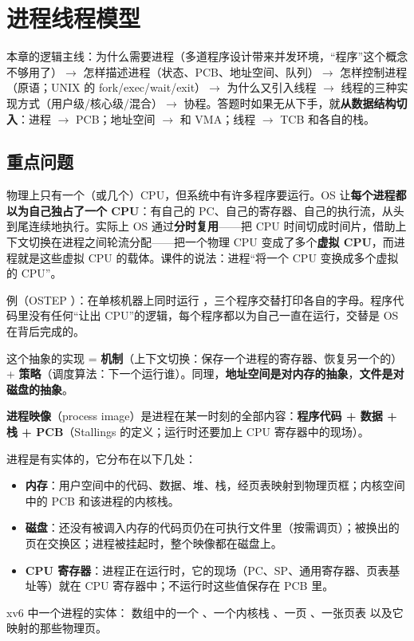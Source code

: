 \section{进程线程模型}

本章的逻辑主线：为什么需要进程（多道程序设计带来并发环境，“程序”这个概念不够用了）$\to$ 怎样描述进程（状态、PCB、地址空间、队列）$\to$ 怎样控制进程（原语；UNIX 的 fork/exec/wait/exit）$\to$ 为什么又引入线程 $\to$ 线程的三种实现方式（用户级/核心级/混合）$\to$ 协程。答题时如果无从下手，就\textbf{从数据结构切入}：进程 $\to$ PCB；地址空间 $\to$  和 VMA；线程 $\to$ TCB 和各自的栈。

\subsection{重点问题}

物理上只有一个（或几个）CPU，但系统中有许多程序要运行。OS 让\textbf{每个进程都以为自己独占了一个 CPU}：有自己的 PC、自己的寄存器、自己的执行流，从头到尾连续地执行。实际上 OS 通过\textbf{分时复用}——把 CPU 时间切成时间片，借助上下文切换在进程之间轮流分配——把一个物理 CPU 变成了多个\textbf{虚拟 CPU}，而进程就是这些虚拟 CPU 的载体。课件的说法：进程“将一个 CPU 变换成多个虚拟的 CPU”。

例（OSTEP ）：在单核机器上同时运行 ，三个程序交替打印各自的字母。程序代码里没有任何“让出 CPU”的逻辑，每个程序都以为自己一直在运行，交替是 OS 在背后完成的。

这个抽象的实现 = \textbf{机制}（上下文切换：保存一个进程的寄存器、恢复另一个的）+ \textbf{策略}（调度算法：下一个运行谁）。同理，\textbf{地址空间是对内存的抽象}，\textbf{文件是对磁盘的抽象}。

\textbf{进程映像}（process image）是进程在某一时刻的全部内容：\textbf{程序代码 + 数据 + 栈 + PCB}（Stallings 的定义；运行时还要加上 CPU 寄存器中的现场）。

进程是有实体的，它分布在以下几处：
\begin{itemize}
    \item \textbf{内存}：用户空间中的代码、数据、堆、栈，经页表映射到物理页框；内核空间中的 PCB 和该进程的内核栈。
    \item \textbf{磁盘}：还没有被调入内存的代码页仍在可执行文件里（按需调页）；被换出的页在交换区；进程被挂起时，整个映像都在磁盘上。
    \item \textbf{CPU 寄存器}：进程正在运行时，它的现场（PC、SP、通用寄存器、页表基址等）就在 CPU 寄存器中；不运行时这些值保存在 PCB 里。
\end{itemize}
xv6 中一个进程的实体： 数组中的一个 、一个内核栈 、一页 、一张页表  以及它映射的那些物理页。


